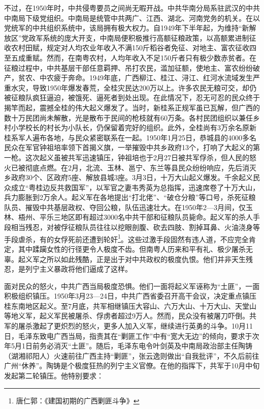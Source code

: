 不过，在1950年时，中共侵粤要员之间尚无暇开战。中共华南分局系驻武汉的中共中南局下级党组织。中南局是统管中共两广、江西、湖北、河南党务的机关。在以党统军的中共组织系统中，该局拥有极大权力。自1949年下半年起，为维持“新解放区”党政军系统的庞大开支，中南局便积极推行高额征粮政策，以高额累进制征收农村田赋，规定对人均农业年收入不满150斤稻谷者免征、对地主、富农征收四至五成重赋。然而，在南粤农村，人均年收入不足150斤者只有极少数赤贫者。在征粮过程中，中共基层干部任意羁押、吊打农民，滥加征额，使地主、富农纷纷破产，贫农、中农疲于奔命。1949年底，广西柳江、桂江、浔江、红河水流域发生严重水灾，导致1950年爆发春荒，全桂灾民达200万以上。许多农民无粮可交，却仍被征粮队疯狂逼迫，被饿死、逼死者到处出现。在此情况下，忍无可忍的民众终于揭竿而起，震撼全桂的伟大起义爆发了。当时，新桂系正规军虽已瓦解，但广西的数十万民团尚未解散，光是散布于民间的枪枝就有60万条。各村民团组织以兼任乡村小学校长的村长为小队长，仍保留着完好的组织。此外，全桂尚有3万余名原新桂系军人遍布各地，与民众紧密联系在一起。1950年1月25日，恭城县的4000多名民众在军官钟祖培率领下首揭义旗，一举摧毁中共乡政府13个，打响了大起义的第一枪。这次起义虽被共军迅速镇压，钟祖培也于2月27日被共军俘杀，但人民的怒火已被彻底点燃。在2月，北流、玉林、邕宁、东兰等县民众纷纷响应，先后消灭乡政府30个、区政府5座、解放县城3座。3月3日，十万大山起义爆发。千余起义民众成立“粤桂边反共救国军”，以军官之妻韦秀英为总指挥，迅速席卷了十万大山，兵力膨胀到2万余人。起义军在各地提出“打北佬”、“破仓分粮”等口号，杀死征粮队员、摧毁中共基层政权、夺回公粮，队伍迅速壮大。在1950年2—3月间，仅玉林、梧州、平乐三地区即有超过3000名中共干部和征粮队员毙命。起义军的杀人手段相当残忍，对被俘征粮队员往往以挖眼剖腹、砍去四肢、割掉耳鼻、火油浇身等手段虐杀，有的女俘死前还遭到轮奸\footnote{唐仁郭：《建国初期的广西剿匪斗争》}。这些过激手段固然有违人道，不应完全肯定，其中蹂躏女性的行径更令人极度不齿。但南粤人历来和平有礼、极少屠杀无辜。起义军之所以如此残酷，正是出于对中共政权的极度仇恨。他们并非天生残忍，是列宁主义暴政将他们逼成了这样。

面对民众的怒火，中共广西当局极度恐惧。他们一面将起义军诬称为“土匪”，一面积极组织镇压。1950年3月23—24日，中共广西省委召开高干会议，决定重点镇压桂东南地区起义。至7月底，共军相继镇压大容山、六万大山、十万大山、天堂山等地义军，起义军民被屠杀、俘虏者超过9万人。然而，民众没有被屠刀吓倒。共军的屠杀激起了更炽烈的怒火，更多人加入义军，继续进行英勇的斗争。10月11日，毛泽东致电广西当局，指责其在“剿匪工作”中有“宽大无边”的倾向，要求于次年5月1日前务必消灭“土匪”。随后，毛泽东电令叶剑英及中南局政治部主任陶铸（湖湘祁阳人）火速前往广西主持“剿匪”，张云逸则做出“自我批评”，不久后前往广州“休养”。陶铸是个极度狂热的列宁主义官僚。在他的指挥下，共军于10月中旬发起第二轮镇压。他特别要求：

